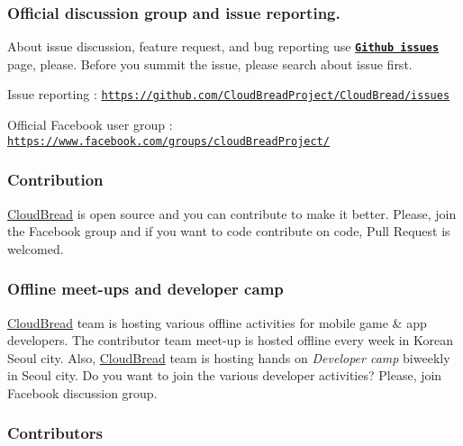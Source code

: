 \subsubsection*{Official discussion group and issue reporting.}

About issue discussion, feature request, and bug reporting use {\bfseries \href{https://github.com/CloudBreadProject/CloudBread/issues}{\tt Github issues}} page, please. Before you summit the issue, please search about issue first.
\begin{DoxyItemize}
\item Issue reporting \+: \href{https://github.com/CloudBreadProject/CloudBread/issues}{\tt https\+://github.\+com/\+Cloud\+Bread\+Project/\+Cloud\+Bread/issues}
\item Official Facebook user group \+: \href{https://www.facebook.com/groups/cloudBreadProject/}{\tt https\+://www.\+facebook.\+com/groups/cloud\+Bread\+Project/}
\end{DoxyItemize}

\subsubsection*{Contribution}

\hyperlink{a00217}{Cloud\+Bread} is open source and you can contribute to make it better. Please, join the Facebook group and if you want to code contribute on code, Pull Request is welcomed.

\subsubsection*{Offline meet-\/ups and developer camp}

\hyperlink{a00217}{Cloud\+Bread} team is hosting various offline activities for mobile game \& app developers. The contributor team meet-\/up is hosted offline every week in Korean Seoul city. Also, \hyperlink{a00217}{Cloud\+Bread} team is hosting hands on {\itshape Developer camp} biweekly in Seoul city. Do you want to join the various developer activities? Please, join Facebook discussion group.

\subsubsection*{Contributors}

\href{https://github.com/CloudBreadPaPa}{\tt } \href{https://github.com/yshong93}{\tt } \href{https://github.com/junghyun4425}{\tt } \href{https://github.com/Beingbook}{\tt } \href{https://github.com/finesunday}{\tt }\href{https://github.com/style0912}{\tt }

